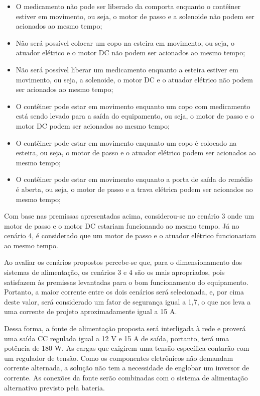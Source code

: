     \begin{itemize}
        
        \item O medicamento não pode ser liberado da comporta enquanto o contêiner estiver em movimento, ou seja, o motor de passo e a solenoide não podem ser acionados ao mesmo tempo;
        
        \item Não será possível colocar um copo na esteira em movimento, ou seja, o atuador elétrico e o motor DC não podem ser acionados ao mesmo tempo;
        
        \item Não será possível liberar um medicamento enquanto a esteira estiver em movimento, ou seja, a solenoide, o motor DC e o atuador elétrico não podem ser acionados ao mesmo tempo;
        
        \item O contêiner pode estar em movimento enquanto um copo com medicamento está sendo levado para a saída do equipamento, ou seja, o motor de passo e o motor DC podem ser acionados ao mesmo tempo;
        
        \item O contêiner pode estar em movimento enquanto um copo é colocado na esteira, ou seja, o motor de passo e o atuador elétrico podem ser acionados ao mesmo tempo;
        
        \item O contêiner pode estar em movimento enquanto a porta de saída do remédio é aberta, ou seja, o motor de passo e a trava elétrica podem ser acionados ao mesmo tempo;

    \end{itemize}

Com base nas premissas apresentadas acima, considerou-se no cenário 3 onde um motor de passo e o motor DC estariam funcionando ao mesmo tempo. Já no cenário 4, é considerado que um motor de passo e o atuador elétrico funcionariam ao mesmo tempo.

Ao avaliar os cenários propostos percebe-se que, para o dimensionamento dos sistemas de alimentação, os cenários 3 e 4 são os mais apropriados, pois satisfazem às premissas levantadas para o bom funcionamento do equipamento. Portanto, a maior corrente entre os dois cenários será selecionada, e, por cima deste valor, será considerado um fator de segurança igual a 1,7, o que nos leva a uma corrente de projeto aproximadamente igual a 15 A.

Dessa forma, a fonte de alimentação proposta será interligada à rede e proverá uma saída CC regulada igual a 12 V e 15 A de saída, portanto, terá uma potência de 180 W. As cargas que exigirem uma tensão específica contarão com um regulador de tensão. Como os componentes eletrônicos não demandam corrente alternada, a solução não tem a necessidade de englobar um inversor de corrente. As conexões da fonte serão combinadas com o sistema de alimentação alternativo previsto pela bateria. 

